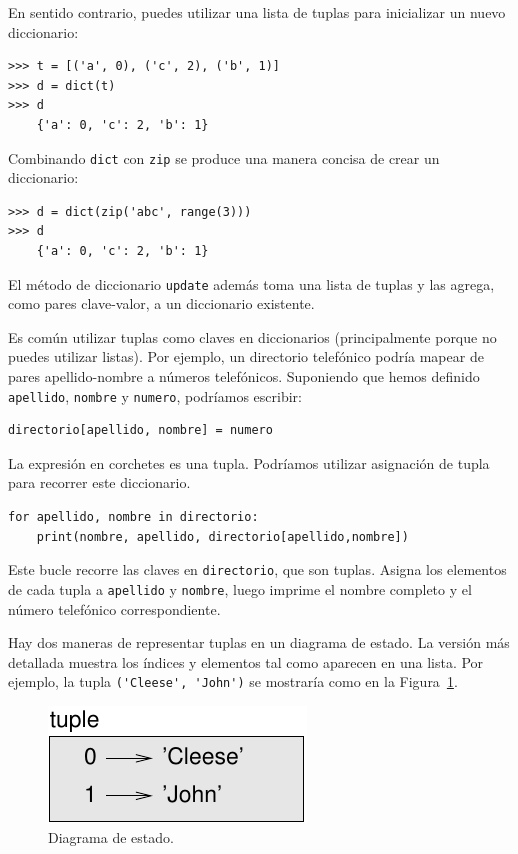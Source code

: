 \documentclass[10pt]{book}
\begin{document}
En sentido contrario, puedes utilizar una lista de tuplas para
inicializar un nuevo diccionario: 

\begin{verbatim}
>>> t = [('a', 0), ('c', 2), ('b', 1)]
>>> d = dict(t)
>>> d
    {'a': 0, 'c': 2, 'b': 1}
\end{verbatim}

Combinando {\tt dict} con {\tt zip} se produce una manera concisa
de crear un diccionario:

\begin{verbatim}
>>> d = dict(zip('abc', range(3)))
>>> d
    {'a': 0, 'c': 2, 'b': 1}
\end{verbatim}
%
El método de diccionario {\tt update} además toma una lista de tuplas
y las agrega, como pares clave-valor, a un diccionario existente.

Es común utilizar tuplas como claves en diccionarios (principalmente porque
no puedes utilizar listas).  Por ejemplo, un directorio telefónico podría mapear
de pares apellido-nombre a números telefónicos.  Suponiendo
que hemos definido {\tt apellido}, {\tt nombre} y {\tt numero},
podríamos escribir:

\begin{verbatim}
directorio[apellido, nombre] = numero
\end{verbatim}
%
La expresión en corchetes es una tupla.  Podríamos utilizar asignación
de tupla para recorrer este diccionario.

\begin{verbatim}
for apellido, nombre in directorio:
    print(nombre, apellido, directorio[apellido,nombre])
\end{verbatim}
%
Este bucle recorre las claves en {\tt directorio}, que son tuplas.  Asigna
los elementos de cada tupla a {\tt apellido} y {\tt nombre}, luego
imprime el nombre completo y el número telefónico correspondiente.

Hay dos maneras de representar tuplas en un diagrama de estado.  La versión
más detallada muestra los índices y elementos tal como aparecen en
una lista.  Por ejemplo, la tupla \verb"('Cleese', 'John')" se mostraría
como en la Figura~\ref{fig.tuple1}.

\begin{figure}
\centerline
{\includegraphics[scale=0.8]{figs/tuple1.pdf}}
\caption{Diagrama de estado.}
\label{fig.tuple1}
\end{figure}
\end{document}
